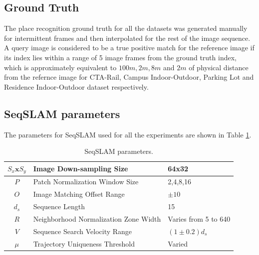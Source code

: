 \documentclass[letterpaper, 10 pt, conference]{ieeeconf}  %
\begin{document}
\subsection{Ground Truth}
The place recognition ground truth for all the datasets was generated manually for intermittent frames and then interpolated for the rest of the image sequence. A query image is considered to be a true positive match for the reference image if its index lies within a range of 5 image frames from the ground truth index, which is approximately equivalent to $100m,2m,8m$ and $2m$ of physical distance from the refernce image for CTA-Rail, Campus Indoor-Outdoor, Parking Lot and Residence Indoor-Outdoor dataset respectively.

\subsection{SeqSLAM parameters}
The parameters for SeqSLAM used for all the experiments are shown in Table \ref{table:seqSLAMParams}.

\begin{table}[!h]
	\caption{SeqSLAM parameters.}
	\begin{tabular}{|c|p{4cm}|p{2.5cm}|}
		\hline
		$S_x\mathbf{x}S_y$ & Image Down-sampling Size & 64x32 \\
		\hline
		$P$ & Patch Normalization Window Size & {2,4,8,16} \\
		\hline
		$O$ & Image Matching Offset Range & $\pm10$ \\
		\hline
		$d_s$ & Sequence Length & 15 \\
		\hline
		$R$ & Neighborhood Normalization Zone Width & Varies from 5 to 640 \\
		\hline
		$V$ & Sequence Search Velocity Range & $(1\pm0.2)d_s$ \\
		\hline
		$\mu$ & Trajectory Uniqueness Threshold & Varied \\
		\hline
	\end{tabular}
	\label{table:seqSLAMParams}
\end{table}
\end{document}
